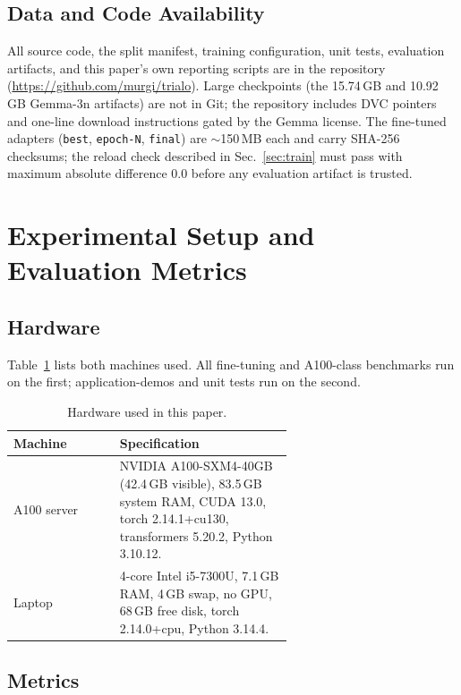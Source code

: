 \documentclass[conference]{IEEEtran}
\newcommand{\code}[1]{\texttt{\small #1}}
\begin{document}
\subsection{Data and Code Availability}
\label{sec:avail}

All source code, the split manifest, training configuration, unit
tests, evaluation artifacts, and this paper's own reporting scripts
are in the repository
(\url{https://github.com/murgi/trialo}). Large checkpoints
(the 15.74\,GB and 10.92\,GB Gemma-3n artifacts) are not in Git;
the repository includes DVC pointers and one-line download
instructions gated by the Gemma license. The fine-tuned adapters
(\code{best}, \code{epoch-N}, \code{final}) are $\sim$150\,MB each and
carry SHA-256 checksums; the reload check described in
Sec.~\ref{sec:train} must pass with maximum absolute difference
0.0 before any evaluation artifact is trusted.

\section{Experimental Setup and Evaluation Metrics}
\label{sec:setup}

\subsection{Hardware}
Table~\ref{tab:hardware} lists both machines used. All fine-tuning
and A100-class benchmarks run on the first; application-demos and
unit tests run on the second.

\begin{table}[t]
\caption{Hardware used in this paper.}
\label{tab:hardware}
\centering
\small
\begin{tabular}{lp{0.62\linewidth}}
\toprule
\textbf{Machine} & \textbf{Specification} \\
\midrule
A100 server & NVIDIA A100-SXM4-40GB (42.4\,GB visible),
83.5\,GB system RAM, CUDA 13.0,
torch 2.14.1+cu130, transformers 5.20.2,
Python 3.10.12. \\
Laptop & 4-core Intel i5-7300U, 7.1\,GB RAM,
4\,GB swap, no GPU, 68\,GB free disk,
torch 2.14.0+cpu, Python 3.14.4. \\
\bottomrule
\end{tabular}
\end{table}

\subsection{Metrics}
\label{sec:metrics}
\end{document}
